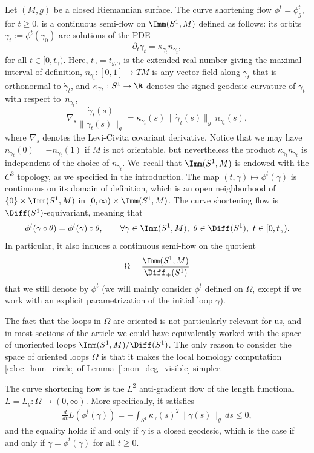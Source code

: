 Let $(M,g)$ be a closed Riemannian surface.
The curve shortening flow $\phi^t=\phi^t_g$, for $t\geq0$, is a continuous semi-flow on $\Imm(S^1,M)$ defined as follows: its orbits $\gamma_t:=\phi^t(\gamma_0)$ are solutions of the PDE
\[
\partial_t\gamma_t=\kappa_{\gamma_t}n_{\gamma_t},
\]
for all $t\in[0,t_\gamma)$. Here, $t_\gamma=t_{g,\gamma}$ is the extended real number giving the maximal interval of definition, $n_{\gamma_t}:[0,1]\to TM$ is any vector field along $\gamma_t$ that is orthonormal to $\dot\gamma_t$, and $\kappa_{\gamma_t}:S^1\to\R$ denotes the signed geodesic curvature of $\gamma_t$ with respect to~$n_{\gamma_t}$, \ie
\[
\nabla\!_s\frac{\dot\gamma_t(s)}{\|\dot\gamma_t(s)\|_g}
=
\kappa_{\gamma_t}(s)\,\|\dot\gamma_t(s)\|_g\,n_{\gamma_t}(s),
\]
where $\nabla_s$ denotes the Levi-Civita covariant derivative. Notice that we may have $n_{\gamma_t}(0)=-n_{\gamma_t}(1)$ if $M$ is not orientable, but nevertheless the product $\kappa_{\gamma_t} n_{\gamma_t}$ is independent of the choice of $n_{\gamma_t}$. We~recall that $\Imm(S^1,M)$ is endowed with the $C^3$ topology, as we specified in the introduction.
The map $(t,\gamma)\mapsto\phi^t(\gamma)$ is continuous on its domain of definition, which is an open neighborhood of $\{0\}\times\Imm(S^1,M)$ in $[0,\infty)\times\Imm(S^1,M)$.
The curve shortening flow is $\Diff(S^1)$-equivariant, meaning that
\begin{align*}
\phi^t(\gamma\circ\theta)
=
\phi^t(\gamma)\circ\theta,
\qquad\forall\gamma\in\Imm(S^1,M),\ \theta\in\Diff(S^1),\ t\in[0,t_\gamma).
\end{align*}
In particular, it also induces a continuous semi-flow on the quotient
\[
\Omega=\frac{\Imm(S^1,M)}{\Diff_+(S^1)}
\] that we still denote by $\phi^t$ (we will mainly consider $\phi^t$ defined on $\Omega$, except if we work with an explicit parametrization of the initial loop $\gamma$).

\begin{Remark}
The fact that the loops in $\Omega$ are oriented is not particularly relevant for us, and in most sections of the article we could have equivalently worked with the space of unoriented loops $\Imm(S^1,M)/\Diff(S^1)$. The only reason to consider the space of oriented loops $\Omega$ is that it makes the local homology computation \eqref{e:loc_hom_circle} of Lemma~\ref{l:non_deg_visible} simpler.
\end{Remark}

The curve shortening flow is the $L^2$ anti-gradient flow of the length functional $L=L_g:\Omega\to(0,\infty)$. More specifically, it satisfies
\begin{align}
\label{e:derivative_length}
\frac{d}{dt} L(\phi^t(\gamma))
=
-\int_{S^1} \kappa_\gamma(s)^2 \|\dot\gamma(s)\|_g\,ds
\leq0,
\end{align}
and the equality holds if and only if $\gamma$ is a closed geodesic, which is the case if and only if $\gamma=\phi^t(\gamma)$ for all $t\geq0$.

